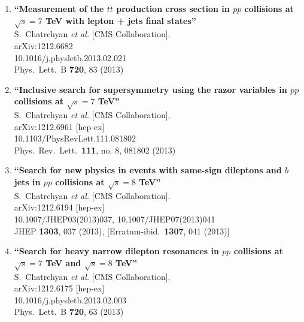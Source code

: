 \documentclass{article}
\begin{document}
\begin{enumerate}
\item%
{\bf ``Measurement of the $t\bar{t}$ production cross section in $pp$ collisions at $\sqrt{s}=7$ TeV with lepton + jets final states''}
  \\{}S.~Chatrchyan {\it et al.}  [CMS Collaboration].
  \\{}arXiv:1212.6682
    \\{}10.1016/j.physletb.2013.02.021
\\{}Phys.\ Lett.\ B {\bf 720}, 83 (2013) %


\item%
{\bf ``Inclusive search for supersymmetry using the razor variables in $pp$ collisions at $\sqrt{s}=7$ TeV''}
  \\{}S.~Chatrchyan {\it et al.}  [CMS Collaboration].
  \\{}arXiv:1212.6961 [hep-ex]
    \\{}10.1103/PhysRevLett.111.081802
\\{}Phys.\ Rev.\ Lett.\  {\bf 111}, no. 8, 081802 (2013) %


\item%
{\bf ``Search for new physics in events with same-sign dileptons and $b$ jets in $pp$ collisions at $\sqrt{s}=8$ TeV''}
  \\{}S.~Chatrchyan {\it et al.}  [CMS Collaboration].
  \\{}arXiv:1212.6194 [hep-ex]
    \\{}10.1007/JHEP03(2013)037, 10.1007/JHEP07(2013)041
\\{}JHEP {\bf 1303}, 037 (2013), [Erratum-ibid.\  {\bf 1307}, 041 (2013)] %


\item%
{\bf ``Search for heavy narrow dilepton resonances in $pp$ collisions at $\sqrt{s}=7$ TeV and $\sqrt{s}=8$ TeV''}
  \\{}S.~Chatrchyan {\it et al.}  [CMS Collaboration].
  \\{}arXiv:1212.6175 [hep-ex]
    \\{}10.1016/j.physletb.2013.02.003
\\{}Phys.\ Lett.\ B {\bf 720}, 63 (2013) %



\end{enumerate}
\end{document}
